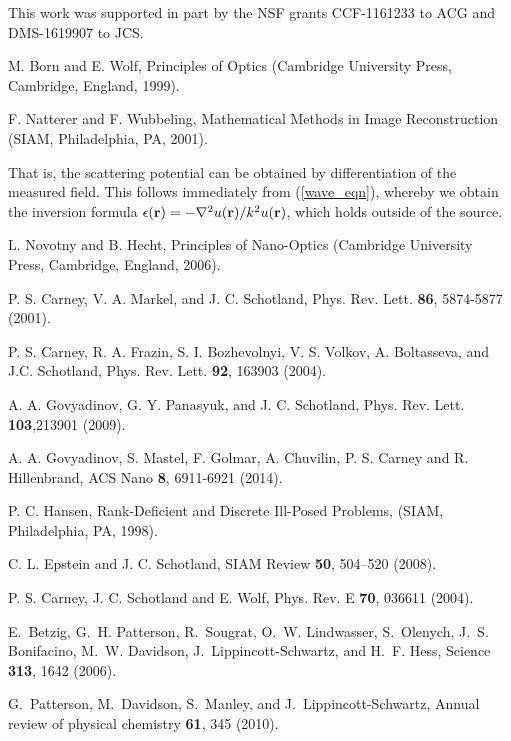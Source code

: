 \documentclass[prl,twocolumn]{revtex4-1}
\newcommand{\lap}{\nabla^2}
\newcommand{\Br}{{\bf r}}
\begin{document}
\acknowledgments
This work was supported in part by the NSF grants CCF-1161233 to ACG and DMS-1619907 to JCS.


\begin{thebibliography}{10}

M. Born and E. Wolf, Principles of Optics (Cambridge University Press, Cambridge, England, 1999).

F. Natterer and F. Wubbeling, Mathematical Methods in Image Reconstruction (SIAM, Philadelphia, PA, 2001).

That is, the scattering potential can be obtained by differentiation of the measured field. This follows immediately from (\ref{wave_eqn}), whereby we obtain the inversion formula $\epsilon(\Br) = -\lap u(\Br)/k^2 u(\Br)$, which holds outside of the source.


L. Novotny and B. Hecht, Principles of Nano-Optics (Cambridge University Press, Cambridge, England, 2006).

P. S. Carney, V. A. Markel, and J. C. Schotland, Phys. Rev. Lett. {\bf 86}, 5874-5877 (2001).

P. S. Carney, R. A. Frazin, S. I. Bozhevolnyi, V. S. Volkov, A. Boltasseva, and J.C. Schotland, Phys. Rev. Lett. {\bf 92}, 163903 (2004).

A. A. Govyadinov, G. Y. Panasyuk, and J. C. Schotland, Phys. Rev. Lett. {\bf 103},213901 (2009).

A. A. Govyadinov, S. Mastel, F. Golmar, A. Chuvilin, P. S. Carney and R. Hillenbrand,  ACS Nano {\bf 8}, 6911-6921 (2014).

P. C. Hansen, Rank-Deficient and Discrete Ill-Posed Problems, (SIAM, Philadelphia, PA, 1998).

C. L.  Epstein and J. C. Schotland,  SIAM Review {\bf 50}, 504--520 (2008).

P. S. Carney, J. C. Schotland and E. Wolf, Phys. Rev. E {\bf 70}, 036611 (2004).

E.~Betzig, G.~H. Patterson, R.~Sougrat, O.~W. Lindwasser, S.~Olenych, J.~S.
Bonifacino, M.~W. Davidson, J.~Lippincott-Schwartz, and H.~F. Hess, Science
\textbf{313}, 1642 (2006).

G.~Patterson, M.~Davidson, S.~Manley, and J.~Lippincott-Schwartz, Annual review
of physical chemistry \textbf{61}, 345 (2010).


\end{thebibliography}
\end{document}
